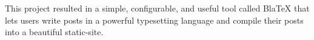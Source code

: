 This project resulted in a simple, configurable, and useful tool called BlaTeX that lets users write posts in a powerful typesetting language and compile their posts into a beautiful static-site. 


